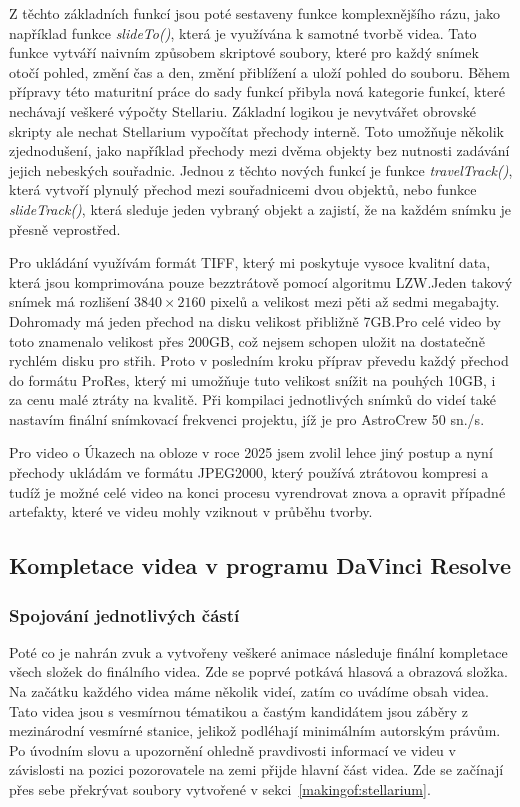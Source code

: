 \documentclass[12pt,a4paper,titlepage]{article}
\begin{document}
Z těchto základních funkcí jsou poté sestaveny funkce komplexnějšího rázu, jako například funkce \textit{slideTo()}, která je využívána k samotné tvorbě videa. Tato funkce vytváří naivním způsobem skriptové soubory, které pro každý snímek otočí pohled, změní čas a den, změní přiblížení a uloží pohled do souboru. Během přípravy této maturitní práce do sady funkcí přibyla nová kategorie funkcí, které nechávají veškeré výpočty Stellariu. Základní logikou je nevytvářet obrovské skripty ale nechat Stellarium vypočítat přechody interně. Toto umožňuje několik zjednodušení, jako například přechody mezi dvěma objekty bez nutnosti zadávání jejich nebeských souřadnic. Jednou z těchto nových funkcí je funkce \textit{travelTrack()}, která vytvoří plynulý přechod mezi souřadnicemi dvou objektů, nebo funkce \textit{slideTrack()}, která sleduje jeden vybraný objekt a zajistí, že na každém snímku je přesně veprostřed. %

Pro ukládání využívám formát TIFF, který mi poskytuje vysoce kvalitní data, která jsou komprimována pouze bezztrátově pomocí algoritmu LZW.\@ Jeden takový snímek má rozlišení \(3840\times2160\) pixelů a velikost mezi pěti až sedmi megabajty. Dohromady má jeden přechod na disku velikost přibližně 7GB.\@ Pro celé video by toto znamenalo velikost přes 200GB, což nejsem schopen uložit na dostatečně rychlém disku pro střih. Proto v posledním kroku příprav převedu každý přechod do formátu ProRes, který mi umožňuje tuto velikost snížit na pouhých 10GB, i za cenu malé ztráty na kvalitě. Při kompilaci jednotlivých snímků do videí také nastavím finální snímkovací frekvenci projektu, jíž je pro AstroCrew 50 sn./s.

Pro video o Úkazech na obloze v roce 2025 jsem zvolil lehce jiný postup a nyní přechody ukládám ve formátu JPEG2000, který používá ztrátovou kompresi a tudíž je možné celé video na konci procesu vyrendrovat znova a opravit případné artefakty, které ve videu mohly vziknout v průběhu tvorby.
\subsection{Kompletace videa v programu DaVinci Resolve}\label{makingof:resolve}
\subsubsection{Spojování jednotlivých částí}\label{makingof:resolve:merging}
Poté co je nahrán zvuk a vytvořeny veškeré animace následuje finální kompletace všech složek do finálního videa. Zde se poprvé potkává hlasová a obrazová složka. Na začátku každého videa máme několik videí, zatím co uvádíme obsah videa. Tato videa jsou s vesmírnou tématikou a častým kandidátem jsou záběry z mezinárodní vesmírné stanice, jelikož podléhají minimálním autorským právům. Po úvodním slovu a upozornění ohledně pravdivosti informací ve videu v závislosti na pozici pozorovatele na zemi přijde hlavní část videa. Zde se začínají přes sebe překrývat soubory vytvořené v sekci~\ref{makingof:stellarium}.
\end{document}
